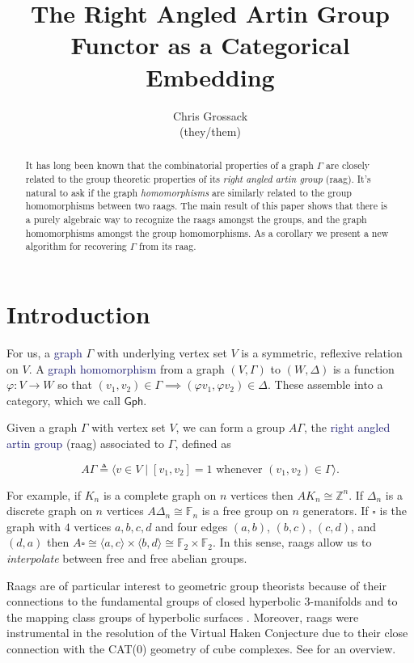 \documentclass[12pt]{article}
\author{Chris Grossack\\ (they/them)}
\title{The Right Angled Artin Group Functor as a Categorical Embedding}
\theoremstyle{definition}
\theoremstyle{theorem}
\newcommand{\teq}{\triangleq}
\newcommand*{\important}[1]{\textcolor{MidnightBlue}{#1}}
\begin{document}
\maketitle

\begin{abstract}
  It has long been known that the combinatorial properties of a graph $\Gamma$
  are closely related to the group theoretic properties of its 
  \emph{right angled artin group} (raag). It's natural to ask if the 
  graph \emph{homomorphisms} are similarly related to the group homomorphisms 
  between two raags. The main result of this paper shows that there 
  is a purely algebraic way to recognize the raags amongst the groups, and 
  the graph homomorphisms amongst the group homomorphisms. 
  As a corollary we 
  present a new algorithm for recovering $\Gamma$ from its raag.
\end{abstract}

\section{Introduction}
\label{intro}
  For us, a \important{graph} $\Gamma$ with underlying vertex set $V$ is a 
  symmetric, reflexive relation on $V$. A \important{graph homomorphism} from 
  a graph $(V,\Gamma)$ to $(W,\Delta)$ is a 
  function $\varphi : V \to W$ so that $(v_1, v_2) \in \Gamma \implies (\varphi v_1, \varphi v_2) \in \Delta$.
  These assemble into a category, which we call $\mathsf{Gph}$.

  Given a graph $\Gamma$ with vertex set $V$, we can form a group $A\Gamma$, the 
  \important{right angled artin group} (raag) associated to $\Gamma$, defined as

  \[ A\Gamma \teq \langle v \in V \mid [v_1, v_2] = 1 \text{ whenever } (v_1,v_2) \in \Gamma \rangle .\]

  For example, if $K_n$ is a complete graph on $n$ vertices then 
  $AK_n \cong \mathbb{Z}^n$. If $\Delta_n$ is a discrete graph on $n$ vertices
  $A\Delta_n \cong \mathbb{F}_n$ is a free group on $n$ generators. 
  If $\square$ is the graph with $4$ vertices $a,b,c,d$ and 
  four edges $(a,b)$, $(b,c)$, $(c,d)$, and $(d,a)$ then $A \square \cong 
  \langle a, c \rangle \times \langle b, d \rangle \cong \mathbb{F}_2 \times \mathbb{F}_2$.
  In this sense, raags allow us to \emph{interpolate} between free and free
  abelian groups. 

  Raags are of particular interest to geometric group theorists because
  of their connections to the fundamental groups of closed hyperbolic
  $3$-manifolds \cite{servatiusSurfaceSubgroupsGraph1989} 
  and to the mapping class groups of hyperbolic surfaces 
  \cite{kimGeometryCurveGraph2014}. Moreover, raags were instrumental in
  the resolution of the Virtual Haken Conjecture \cite{agolVirtualHakenConjecture2013}
  due to their close connection with the CAT(0) geometry of cube complexes. 
  See \cite{bestvinaGeometricGroupTheory2013} for an overview.
\end{document}
